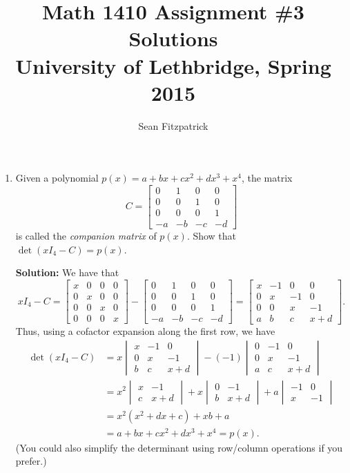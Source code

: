 \documentclass[letterpaper,12pt]{article}
\title{Math 1410 Assignment \#3 Solutions\\University of Lethbridge, Spring 2015}
\author{Sean Fitzpatrick}
\begin{document}
 \maketitle

\begin{enumerate}

\item Given a polynomial $p(x)=a+bx+cx^2+dx^3+x^4$, the matrix
\[
 C = \begin{bmatrix}
      0&1&0&0\\
0&0&1&0\\
0&0&0&1\\
-a&-b&-c&-d
     \end{bmatrix}
\]
is called the {\em companion matrix} of $p(x)$. Show that $\det(xI_4-C)=p(x)$.

\bigskip

{\bf Solution:} We have that
\[
 xI_4-C = \begin{bmatrix}x&0&0&0\\
0&x&0&0\\
0&0&x&0\\
0&0&0&x           
          \end{bmatrix} - \begin{bmatrix}
      0&1&0&0\\
0&0&1&0\\
0&0&0&1\\
-a&-b&-c&-d
     \end{bmatrix} = \begin{bmatrix}x&-1&0&0\\0&x&-1&0\\0&0&x&-1\\a&b&c&x+d\end{bmatrix}.
\]
Thus, using a cofactor expansion along the first row, we have
\begin{align*}
 \det(xI_4-C) & = x\begin{vmatrix}x&-1&0\\0&x&-1\\b&c&x+d\end{vmatrix} - (-1)\begin{vmatrix}0&-1&0\\0&x&-1\\a&c&x+d\end{vmatrix}\\
& = x^2\begin{vmatrix}x&-1\\c&x+d\end{vmatrix}+x\begin{vmatrix}0&-1\\b&x+d\end{vmatrix} +a\begin{vmatrix}-1&0\\x&-1\end{vmatrix}\\
& = x^2(x^2+dx+c)+xb+a\\
& = a+bx+cx^2+dx^3+x^4 = p(x).
\end{align*}
(You could also simplify the determinant using row/column operations if you prefer.)


\end{enumerate}
\end{document}
